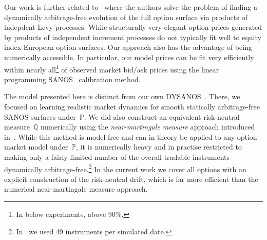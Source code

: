 \documentclass[11pt]{article}
\newcommand{\Q}{\mathbb Q}
\newcommand{\PP}{\mathbb P}
\newcommand{\removeblock}[1]{}
\theoremstyle{plain}
\theoremstyle{definition}
\theoremstyle{remark}
\begin{document}
{Our work is further related to~\cite{TANGET}
where the authors solve the problem of finding a dynamically arbitrage-free evolution of the full option surface via products of indepdent Levy processes. While structurally
very elegant option prices generated by products of independent increment processes do not typically fit well to equity index European option surfaces. 
Our approach also has the advantage of being numerically accessible.
In particular, our model prices can be fit very efficiently within nearly all\footnote{In below experiments, above 90\%.} of observed market bid/ask prices
using the  linear programming SANOS~\cite{SANOS2026} calibration method.

The model presented here is distinct from our own DYSANOS~\cite{DYSANOS2026}. There, we focused on learning
realistic market dynamics for smooth statically arbitrage-free SANOS
surfaces under~$\PP$.
We did also construct an equivalent risk-neutral measure~$\Q$ numerically using the \emph{near-martingale measure} approach introduced in~\cite{removedrift}.
While this method is model-free and can in theory be applied to any option market model under~$\PP$, it is numerically heavy and in practise
restricted to making only a fairly limited number of the overall tradable instruments
dynamically arbitrage-free.\footnote{In~\cite{DYSANOS2026} we used 49 instruments per simulated date.} In the current work we cover all options with
an explicit construction of the risk-neutral drift, which is far more efficient than the numerical near-martingale measure approach.
}
\removeblock{
\begin{abstract}
\noindent
We construct an option market model on a fixed lattice of cash strikes and expiries
that is free of static and dynamic arbitrage by construction. The state is the vector
of gridded risk-neutral densities, encoded by discrete local variances: their
positivity is equivalent to the absence of static arbitrage, so in log coordinates the
state space is Euclidean. Absence of dynamic arbitrage then fixes the drift node by
node, as a covariance between the volatility of each discrete local variance and the
relative volatility of the density at the same node. The restriction goes back to
Carmona and Nadtochiy \cite{CarmonaNadtochiy2008} in the continuum and to Wissel
\cite{Wissel2007} on this lattice; on a fixed lattice it becomes an algebraic
identity, free of the regularity conditions and the maturity derivative of the
continuum, and is computed by one tridiagonal solve per factor and expiry. The spot is read off
the densities, and at each expiry the front density can be made to collapse onto a node, so every
gridded contract settles at its exact payoff. Our main result is existence: for any
bounded, locally Lipschitz volatility structure and any number of factors, the model
has a unique strong solution up to the first expiry and, restarting at each expiry,
across all expiries, with no conditions on the wings. The key estimate bounds the
growth of the relative density volatility $\eta=\psi/q$ across expiries by a
constant of the grid alone, turning an assumption of Wissel into a theorem.
\end{abstract}
}
\end{document}
